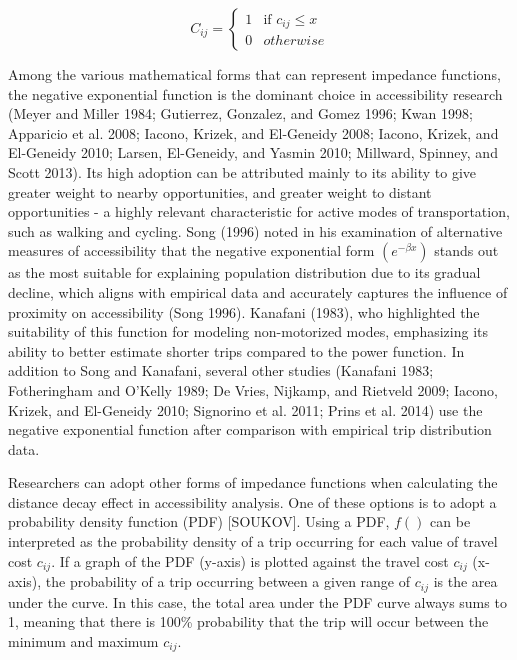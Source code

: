 \documentclass[preprint, 3p,
authoryear]{elsarticle} %
\begin{document}
\begin{equation}
C_{ij} =
\begin{cases}
  1 & \text{if } c_{ij} \le x \\
  0 & otherwise
\end{cases}
\label{eq:equation-02}
\end{equation}

Among the various mathematical forms that can represent impedance
functions, the negative exponential function is the dominant choice in
accessibility research (Meyer and Miller 1984; Gutierrez, Gonzalez, and
Gomez 1996; Kwan 1998; Apparicio et al. 2008; Iacono, Krizek, and
El-Geneidy 2008; Iacono, Krizek, and El-Geneidy 2010; Larsen,
El-Geneidy, and Yasmin 2010; Millward, Spinney, and Scott 2013). Its
high adoption can be attributed mainly to its ability to give greater
weight to nearby opportunities, and greater weight to distant
opportunities - a highly relevant characteristic for active modes of
transportation, such as walking and cycling. Song (1996) noted in his
examination of alternative measures of accessibility that the negative
exponential form \((e ^ {-\beta x})\) stands out as the most suitable
for explaining population distribution due to its gradual decline, which
aligns with empirical data and accurately captures the influence of
proximity on accessibility (Song 1996). Kanafani (1983), who highlighted
the suitability of this function for modeling non-motorized modes,
emphasizing its ability to better estimate shorter trips compared to the
power function. In addition to Song and Kanafani, several other studies
(Kanafani 1983; Fotheringham and O'Kelly 1989; De Vries, Nijkamp, and
Rietveld 2009; Iacono, Krizek, and El-Geneidy 2010; Signorino et al.
2011; Prins et al. 2014) use the negative exponential function after
comparison with empirical trip distribution data.

Researchers can adopt other forms of impedance functions when
calculating the distance decay effect in accessibility analysis. One of
these options is to adopt a probability density function (PDF)
{[}SOUKOV{]}. Using a PDF, \(f()\) can be interpreted as the probability
density of a trip occurring for each value of travel cost \(c_{ij}\). If
a graph of the PDF (y-axis) is plotted against the travel cost
\(c_{ij}\) (x-axis), the probability of a trip occurring between a given
range of \(c_{ij}\) is the area under the curve. In this case, the total
area under the PDF curve always sums to 1, meaning that there is 100\%
probability that the trip will occur between the minimum and maximum
\(c_{ij}\).
\end{document}
